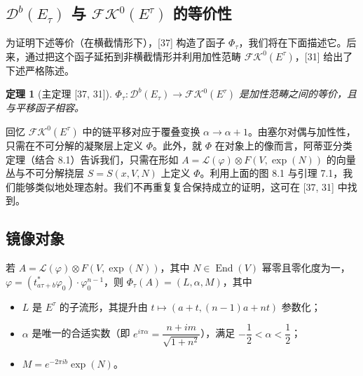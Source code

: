 \documentclass[11pt,a4paper]{article}
\theoremstyle{plain}
\newtheorem{theorem}{定理}[section]
\theoremstyle{definition}
\begin{document}
\subsection{$\mathcal{D}^b(E_\tau)$ 与 $\mathcal{FK}^0(E^\tau)$ 的等价性}

为证明下述等价（在横截情形下），[37] 构造了函子 $\Phi_\tau$，我们将在下面描述它。后来，通过把这个函子延拓到非横截情形并利用加性范畴 $\mathcal{FK}^0(E^\tau)$，[31] 给出了下述严格陈述。

\begin{theorem}[主定理 {[37, 31]}]
$\Phi_\tau:\mathcal{D}^b(E_\tau)\to\mathcal{FK}^0(E^\tau)$ 是加性范畴之间的等价，且与平移函子相容。
\end{theorem}

回忆 $\mathcal{FK}^0(E^\tau)$ 中的链平移对应于覆叠变换 $\alpha\to\alpha+1$。由塞尔对偶与加性性，只需在不可分解的凝聚层上定义 $\Phi$。此外，就 $\Phi$ 在对象上的像而言，阿蒂亚分类定理（结合 8.1）告诉我们，只需在形如 $A=\mathcal{L}(\varphi)\otimes F(V,\exp(N))$ 的向量丛与不可分解挠层 $S=S(x,V,N)$ 上定义 $\Phi$。利用上面的图 8.1 与引理 7.1，我们能够类似地处理态射。我们不再重复复合保持成立的证明，这可在 [37, 31] 中找到。


\subsection{镜像对象}

若 $A=\mathcal{L}(\varphi)\otimes F(V,\exp(N))$，其中 $N\in\operatorname{End}(V)$ 幂零且零化度为一，$\varphi=(t^{*}_{a\tau+b}\varphi_0)\cdot\varphi_0^{n-1}$，则 $\Phi_\tau(A)=(L,\alpha,M)$，其中
\begin{itemize}[leftmargin=1.6em,itemsep=1pt,topsep=2pt]
  \item $L$ 是 $E^\tau$ 的子流形，其提升由 $t\mapsto(a+t,(n-1)a+nt)$ 参数化；
  \item $\alpha$ 是唯一的合适实数（即 $e^{i\pi\alpha}=\dfrac{n+im}{\sqrt{1+n^2}}$），满足 $-\dfrac{1}{2}<\alpha<\dfrac{1}{2}$；
  \item $M=e^{-2\pi ib}\exp(N)$。
\end{itemize}
\end{document}
